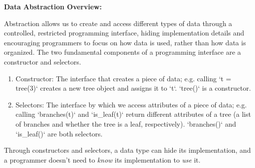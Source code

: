 \textbf{Data Abstraction Overview:}

Abstraction allows us to create and access different types of data through a controlled, restricted programming interface, hiding implementation details and encouraging programmers to focus on how data is used, rather than how data is organized. The two fundamental components of a programming interface are a constructor and selectors.
\begin{enumerate}
	\item Constructor: The interface that creates a piece of data; e.g. calling `t = tree(3)` creates a new tree object and assigns it to `t`. `tree()` is a constructor.
	\item Selectors: The interface by which we access attributes of a piece of data; e.g. calling `branches(t)` and `is\_leaf(t)` return different attributes of a tree (a list of branches and whether the tree is a leaf, respectively). `branches()` and `is\_leaf()` are both selectors.
\end{enumerate}

Through constructors and selectors, a data type can hide its implementation, and a programmer doesn’t need to {\it know} its implementation to {\it use} it.